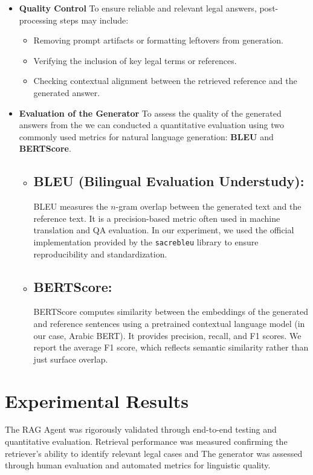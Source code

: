 \begin{itemize}
\item\textbf{Quality Control}
To ensure reliable and relevant legal answers, post-processing steps may include:
\begin{itemize}
	\item Removing prompt artifacts or formatting leftovers from generation.
	\item Verifying the inclusion of key legal terms or references.
	\item Checking contextual alignment between the retrieved reference and the generated answer.
\end{itemize}

\item\textbf{Evaluation of the Generator}
To assess the quality of the generated answers from the we can conducted a quantitative evaluation using two commonly used metrics for natural language generation: \textbf{BLEU} and \textbf{BERTScore}.

\begin{itemize}
	\item \subsection*{BLEU (Bilingual Evaluation Understudy):}
	 BLEU measures the $n$-gram overlap between the generated text and the reference text. It is a precision-based metric often used in machine translation and QA evaluation\citep{papineni2002bleu}. In our experiment, we used the official implementation provided by the \texttt{sacrebleu} library to ensure reproducibility and standardization.
    \item \subsection*{BERTScore:}
	BERTScore computes similarity between the embeddings of the generated and reference sentences using a pretrained contextual language model \citep{zhang2019bertscore}(in our case, Arabic BERT). It provides precision, recall, and F1 scores. We report the average F1 score, which reflects semantic similarity rather than just surface overlap.
\end{itemize}
\end{itemize}
\section{Experimental Results}
The RAG Agent was rigorously validated through end-to-end testing and quantitative evaluation. Retrieval performance was measured confirming the retriever's ability to identify relevant legal cases and The generator was assessed through human evaluation and automated metrics for linguistic quality.
